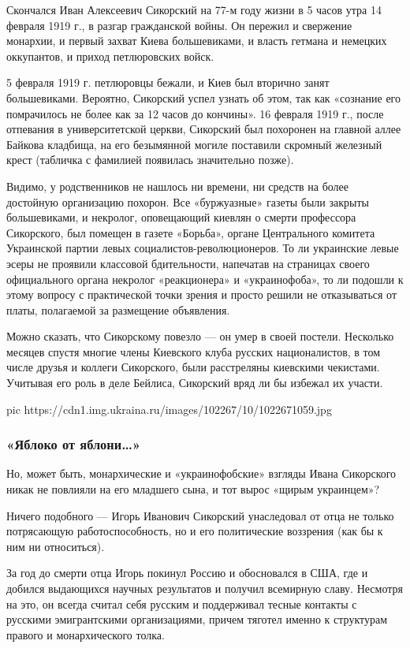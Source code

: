 Скончался Иван Алексеевич Сикорский на 77-м году жизни в 5 часов утра 14
февраля 1919 г., в разгар гражданской войны. Он пережил и свержение монархии, и
первый захват Киева большевиками, и власть гетмана и немецких оккупантов, и
приход петлюровских войск.

5 февраля 1919 г. петлюровцы бежали, и Киев был вторично занят большевиками.
Вероятно, Сикорский успел узнать об этом, так как «сознание его помрачилось не
более как за 12 часов до кончины». 16 февраля 1919 г., после отпевания в
университетской церкви, Сикорский был похоронен на главной аллее Байкова
кладбища, на его безымянной могиле поставили скромный железный крест (табличка
с фамилией появилась значительно позже).

Видимо, у родственников не нашлось ни времени, ни средств на более достойную
организацию похорон. Все «буржуазные» газеты были закрыты большевиками, и
некролог, оповещающий киевлян о смерти профессора Сикорского, был помещен в
газете «Борьба», органе Центрального комитета Украинской партии левых
социалистов-революционеров. То ли украинские левые эсеры не проявили классовой
бдительности, напечатав на страницах своего официального органа некролог
«реакционера» и «украинофоба», то ли подошли к этому вопросу с практической
точки зрения и просто решили не отказываться от платы, полагаемой за размещение
объявления.

Можно сказать, что Сикорскому повезло — он умер в своей постели. Несколько
месяцев спустя многие члены Киевского клуба русских националистов, в том числе
друзья и коллеги Сикорского, были расстреляны киевскими чекистами. Учитывая его
роль в деле Бейлиса, Сикорский вряд ли бы избежал их участи.

\ifcmt
pic https://cdn1.img.ukraina.ru/images/102267/10/1022671059.jpg
\fi

\subsubsection{«Яблоко от яблони…»}

Но, может быть, монархические и «украинофобские» взгляды Ивана Сикорского никак
не повлияли на его младшего сына, и тот вырос «щирым украинцем»?

Ничего подобного — Игорь Иванович Сикорский унаследовал от отца не только
потрясающую работоспособность, но и его политические воззрения (как бы к ним ни
относиться).

За год до смерти отца Игорь покинул Россию и обосновался в США, где и добился
выдающихся научных результатов и получил всемирную славу. Несмотря на это, он
всегда считал себя русским и поддерживал тесные контакты с русскими
эмигрантскими организациями, причем тяготел именно к структурам правого и
монархического толка.

